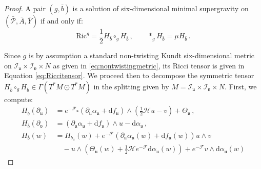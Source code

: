 \documentclass[10pt,a4paper,twoside,reqno]{amsart}
\theoremstyle{plain}
\theoremstyle{definition}
\theoremstyle{remark}
\def\dd{\mathrm{d}}
\def\cH{\mathcal{H}}
\def\cI{\mathcal{I}}
\def\cP{\mathcal{P}}
\def\cP{\mathcal{P}}
\def\cF{\mathcal{F}}
\def\cH{\mathcal{H}}
\def\dd{\mathrm{d}}
\def\fru{\mathfrak{u}}
\def\frv{\mathfrak{v}}
\begin{document}
\begin{proof}
A pair $(g,\bar{b})$ is a solution of six-dimensional minimal supergravity on $(\bar{\cP},\bar{A},\bar{Y})$ if and only if:
\begin{equation*}
\mathrm{Ric}^g =\frac{1}{2} H_{\bar{b}} \circ_g H_{\bar{b}}\, , \qquad \ast_g H_{\bar{b}} = \mu H_{\bar{b}}\, .
\end{equation*}

\noindent
Since $g$ is by assumption a standard non-twisting Kundt six-dimensional metric on $\cI_{\fru}\times \cI_{\frv}\times N$ as given in \eqref{eq:nontwistingmetric}, its Ricci tensor is given in Equation \eqref{eq:Riccitensor}. We proceed then to decompose the symmetric tensor $H_{\bar{b}}\circ_g H_{\bar{b}}\in \Gamma(T^{\ast}M\odot T^{\ast}M)$ in the splitting given by $M= \cI_{\fru}\times \cI_{\frv} \times N$. First, we compute:
\begin{align*}
H_{\bar{b}}(\partial_{\fru}) &=  e^{-\cF_{\fru}} (\partial_{\fru}\alpha_{\fru} + \dd f_{\fru})   \wedge (\frac{1}{2} \cH u - v) +    \Theta_{\fru}\, ,\\
H_{\bar{b}}(\partial_{\frv}) &= (\partial_{\fru}\alpha_{\fru} + \dd f_{\fru})  \wedge u   - \dd \alpha_{\fru}\, ,\\
H_{\bar{b}}(w) &= H_{b_{\fru}}(w) + e^{-\cF} (\partial_{\fru}\alpha_{\fru}(w) + \dd f_{\fru}(w) ) u \wedge v \\
&\quad - u\wedge (\Theta_{\fru}(w)  + \frac{1}{2}\cH e^{-\cF}   \dd \alpha_{\fru}(w) ) + e^{-\cF}  v \wedge \dd \alpha_{\fru}(w)
\end{align*}


\end{proof}
\end{document}

